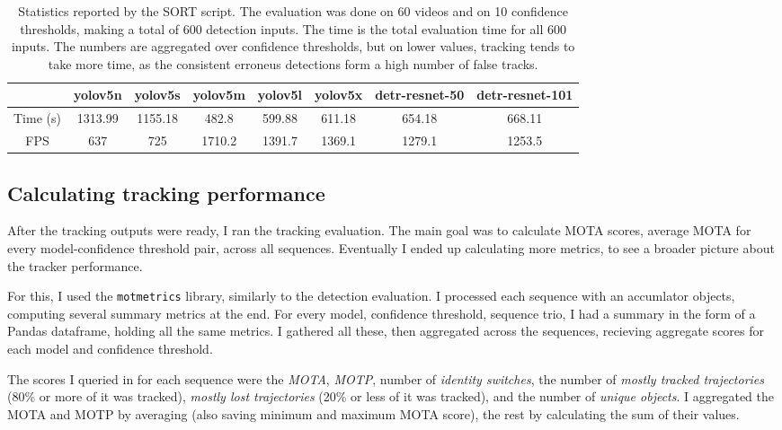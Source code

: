 \begin{table}[h]
    \begin{tabular}{|c|c|c|c|c|c|c|c|}
        \hline
         & yolov5n & yolov5s & yolov5m & yolov5l & yolov5x & detr-resnet-50 & detr-resnet-101 \\
        \hline
        \hline
        Time (s) & 1313.99 & 1155.18 & 482.8 & 599.88 & 611.18 & 654.18 & 668.11\\
        \hline
        \hline
        FPS  & 637 & 725 & 1710.2 & 1391.7 & 1369.1 & 1279.1 & 1253.5 \\
        \hline
    \end{tabular}
    \caption{Statistics reported by the SORT script. The evaluation was done on 60 videos and on 10 confidence thresholds, making a total of 600 detection inputs. The time is the total evaluation time for all 600 inputs. The numbers are aggregated over confidence thresholds, but on lower values, tracking tends to take more time, as the consistent erroneus detections form a high number of false tracks.}
    \label{tab:sort-times}
\end{table}

\subsection{Calculating tracking performance}

After the tracking outputs were ready, I ran the tracking evaluation. The main goal was to calculate MOTA scores, average MOTA for every model-confidence threshold pair, across all sequences. Eventually I ended up calculating more metrics, to see a broader picture about the tracker performance.

For this, I used the \verb|motmetrics| library, similarly to the detection evaluation. I processed each sequence with an accumlator objects, computing several summary metrics at the end. For every model, confidence threshold, sequence trio, I had a summary in the form of a Pandas dataframe, holding all the same metrics. I gathered all these, then aggregated across the sequences, recieving aggregate scores for each model and confidence threshold.

The scores I queried in for each sequence were the \textit{MOTA}, \textit{MOTP}, number of \textit{identity switches}, the number of \textit{mostly tracked trajectories} (80\% or more of it was tracked), \textit{mostly lost trajectories} (20\% or less of it was tracked), and the number of \textit{unique objects}. I aggregated the MOTA and MOTP by averaging (also saving minimum and maximum MOTA score), the rest by calculating the sum of their values.

